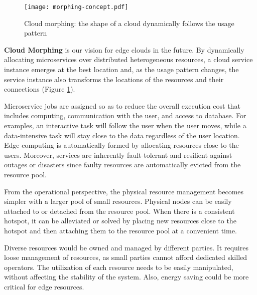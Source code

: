 \begin{figure}[tb]
  \begin{center}
    \texttt{[image: morphing-concept.pdf]}
    \caption{Cloud morphing: the shape of a cloud dynamically follows the
      usage pattern}
    \label{fig:concept}
  \end{center}
\end{figure}

{\bf Cloud Morphing} is our vision for edge clouds in the future.
By dynamically allocating microservices over distributed
heterogeneous resources, a cloud service instance emerges at the best
location and, as the usage pattern changes, the service instance also
transforms the locations of the resources and their connections
(Figure \ref{fig:concept}).

Microservice jobs are assigned so as to reduce the overall execution
cost that includes computing, communication with the user, and access
to database.
For examples, an interactive task will follow the user when the user
moves, while a data-intensive task will stay close to the data
regardless of the user location.
Edge computing is automatically formed by allocating resources close to
the users.
Moreover, services are inherently fault-tolerant and resilient
against outages or disasters since faulty resources are
automatically evicted from the resource pool.

From the operational perspective, the physical resource management
becomes simpler with a larger pool of small resources.
Physical nodes can be easily attached to or detached from the resource pool.
When there is a consistent hotspot, it can be alleviated or solved by
placing new resources close to the hotspot and then attaching them to
the resource pool at a convenient time.

Diverse resources would be owned and managed by different parties.
It requires loose management of resources, as small parties cannot
afford dedicated skilled operators.
The utilization of each resource needs to be easily manipulated,
without affecting the stability of the system.
Also, energy saving could be more critical for edge resources.

